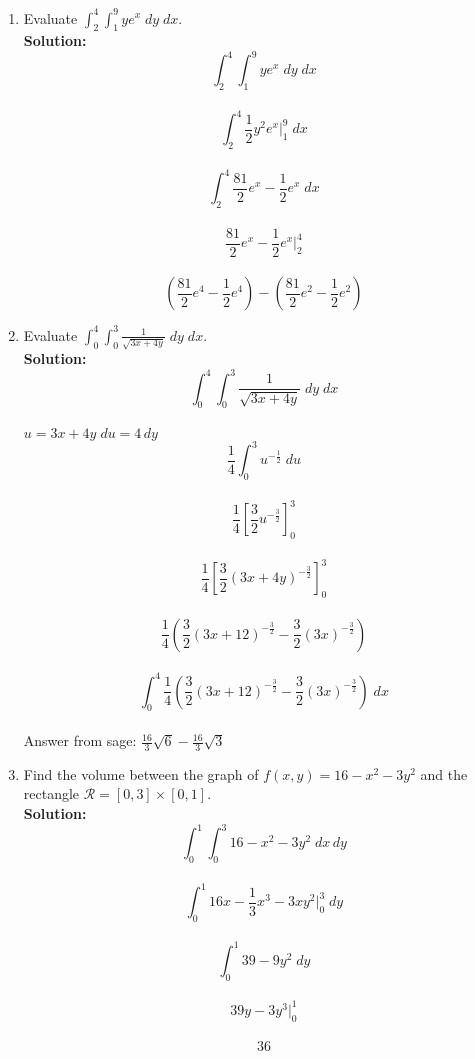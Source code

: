 \documentclass[11pt]{article}
\begin{document}
\begin{enumerate}
    
    
    
    
    
    
    
    \item Evaluate $\int_2^4 \int_1^9 ye^x \; dy \; dx$.
    \\
    \textbf{Solution:}
    \\
    $$\int_2^4 \int_1^9 ye^x \; dy \; dx$$
    \\
    $$\int_2^4  \frac{1}{2} y^2 e^x |_{1}^{9} \; dx$$
    \\
    $$\int_2^4  \frac{81}{2} e^x - \frac{1}{2} e^x \; dx$$
    \\
    $$\frac{81}{2} e^x - \frac{1}{2} e^x |_{2}^{4}$$
    \\
    $$(\frac{81}{2} e^4 - \frac{1}{2} e^4)-(\frac{81}{2} e^2 - \frac{1}{2} e^2 )$$
    
    
    \item Evaluate $\int_0^4 \int_0^3 \frac{1}{\sqrt{3x+4y}} \; dy \; dx$.
    \\
    \textbf{Solution:}
    \\
    $$\int_0^4 \int_0^3 \frac{1}{\sqrt{3x+4y}} \; dy \; dx$$
    \\
    $u=3x+4y \; du=4 \, dy $
    \\
    $$\frac{1}{4} \int_{0}^{3} u^{-\frac{1}{2}} \; du$$
    \\
    $$\frac{1}{4} [ \frac{3}{2} u^{-\frac{3}{2}} ]_{0}^{3} $$
    \\
    $$\frac{1}{4} [ \frac{3}{2} (3x+4y)^{-\frac{3}{2}} ]_{0}^{3} $$
    \\
    $$\frac{1}{4}  (\frac{3}{2} (3x+12)^{-\frac{3}{2}} - \frac{3}{2} (3x)^{-\frac{3}{2}}) $$
    \\
    $$\int_0^4 \frac{1}{4}  (\frac{3}{2} (3x+12)^{-\frac{3}{2}} - \frac{3}{2} (3x)^{-\frac{3}{2}}) \; dx$$
    \\
    Answer from sage: $\frac{16}{3} \sqrt{6} - \frac{16}{3} \sqrt{3}$



\item Find the volume between the graph of $f(x,y) = 16-x^2 - 3y^2$ and the rectangle $\mathcal{R} = [0,3] \times [0,1]$.
\\
\textbf{Solution:} \\

$$ \int_{0}^{1} \int_{0}^{3} 16-x^2-3y^2 \; dx \, dy $$
\\
$$ \int_{0}^{1} 16x-\frac{1}{3}x^3-3xy^2|_{0}^{3} \; dy  $$
\\
$$ \int_{0}^{1} 39-9y^2 \; dy  $$
\\
$$ 39y-3y^3 |_{0}^{1}  $$
\\
$$ 36 $$



\end{enumerate}
\end{document}
